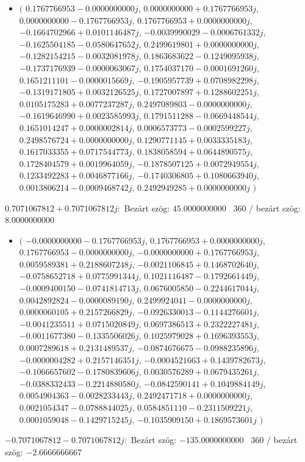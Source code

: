 \documentclass[14pt,a4paper]{article}
\begin{document}
\begin{itemize}
\item
$\big($
$0.1767766953-0.0000000000j$, $0.0000000000+0.1767766953j$, $0.0000000000-0.1767766953j$, $0.1767766953+0.0000000000j$, $-0.1664702966+0.0101146487j$, $-0.0039990029-0.0006761332j$, $-0.1625504185-0.0580647652j$, $0.2499619801+0.0000000000j$, $-0.1282154215-0.0032081978j$, $0.1863683622-0.1249095938j$, $-0.1737176939-0.0000063067j$, $0.1754037170-0.0001691260j$, $0.1651211101-0.0000015669j$, $-0.1905957739+0.0708982298j$, $-0.1319171805+0.0032126525j$, $0.1727007897+0.1288602251j$, $0.0105175283+0.0077237287j$, $0.2497089803-0.0000000000j$, $-0.1619646990+0.0023585993j$, $0.1791511288-0.0669448544j$, $0.1651014247+0.0000002814j$, $0.0006573773-0.0002599227j$, $0.2498576724+0.0000000000j$, $0.1290771145+0.0033335183j$, $0.1617033355+0.0717544773j$, $0.1838058594+0.0644890575j$, $0.1728404579+0.0019964059j$, $-0.1878507125+0.0072949554j$, $0.1233492283+0.0046877166j$, $-0.1740306805+0.1080663940j$, $0.0013806214-0.0009468742j$, $0.2492949285+0.0000000000j$
$\big)$
\end{itemize}
$0.7071067812+0.7071067812j$:\
Bezárt szög: $45.0000000000$ \
360 / bezárt szög: $8.0000000000$\
\begin{itemize}
\item
$\big($
$-0.0000000000-0.1767766953j$, $0.1767766953+0.0000000000j$, $0.1767766953-0.0000000000j$, $-0.0000000000+0.1767766953j$, $0.0059589381+0.2188607248j$, $-0.0021106845+0.1468702640j$, $-0.0758652718+0.0775991344j$, $0.1021116487-0.1792661449j$, $-0.0009400150-0.0741814713j$, $0.0676005850-0.2244617044j$, $0.0042892824-0.0000089190j$, $0.2499924041-0.0000000000j$, $0.0000060105+0.2157266829j$, $-0.0926330013-0.1144276601j$, $-0.0041235511+0.0715020849j$, $0.0697386513+0.2322227481j$, $-0.0011677380-0.1335506026j$, $0.1025979028+0.1696393553j$, $0.0007289618+0.2131489537j$, $-0.0874676675-0.0988235896j$, $-0.0000004282+0.2157146351j$, $-0.0004521663+0.1439782673j$, $-0.1066657602-0.1780839606j$, $0.0030576289+0.0679435261j$, $-0.0388332433-0.2214880580j$, $-0.0842590141+0.1049884149j$, $0.0054904363-0.0028233443j$, $0.2492471718+0.0000000000j$, $0.0021054347-0.0788844025j$, $0.0584851110-0.2311509221j$, $0.0001059048-0.1429715245j$, $-0.1035909150+0.1869573601j$
$\big)$
\end{itemize}
$-0.7071067812-0.7071067812j$:\
Bezárt szög: $-135.0000000000$ \
360 / bezárt szög: $-2.6666666667$\
\end{document}
